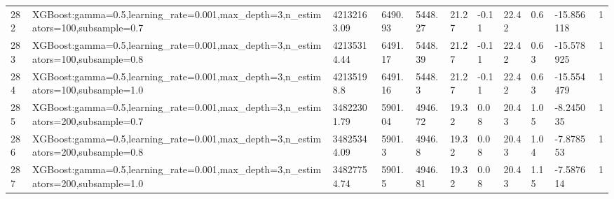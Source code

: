 \begin{longtable}{C{0.8cm} L{2cm} C{1.15cm} C{1.15cm} C{1.15cm} C{1.15cm} C{0.85cm} C{1.25cm} C{1.2cm} C{1.5cm} C{1.0cm}}
282 & XGBoost:\newline gamma=0.5,\newline learning\_rate=0.001,\newline max\_depth=3,\newline n\_estimators=100,\newline subsample=0.7 & 42132163.09 & 6490.93 & 5448.27 & 21.27 & -0.11 & 22.42 & 0.6 & -15.856118 & 1 \\
283 & XGBoost:\newline gamma=0.5,\newline learning\_rate=0.001,\newline max\_depth=3,\newline n\_estimators=100,\newline subsample=0.8 & 42135314.44 & 6491.17 & 5448.39 & 21.27 & -0.11 & 22.42 & 0.63 & -15.578925 & 1 \\
284 & XGBoost:\newline gamma=0.5,\newline learning\_rate=0.001,\newline max\_depth=3,\newline n\_estimators=100,\newline subsample=1.0 & 42135198.8 & 6491.16 & 5448.3 & 21.27 & -0.11 & 22.42 & 0.63 & -15.554479 & 1 \\
285 & XGBoost:\newline gamma=0.5,\newline learning\_rate=0.001,\newline max\_depth=3,\newline n\_estimators=200,\newline subsample=0.7 & 34822301.79 & 5901.04 & 4946.72 & 19.32 & 0.08 & 20.43 & 1.05 & -8.245035 & 1 \\
286 & XGBoost:\newline gamma=0.5,\newline learning\_rate=0.001,\newline max\_depth=3,\newline n\_estimators=200,\newline subsample=0.8 & 34825344.09 & 5901.3 & 4946.8 & 19.32 & 0.08 & 20.43 & 1.04 & -7.878553 & 1 \\
287 & XGBoost:\newline gamma=0.5,\newline learning\_rate=0.001,\newline max\_depth=3,\newline n\_estimators=200,\newline subsample=1.0 & 34827754.74 & 5901.5 & 4946.81 & 19.32 & 0.08 & 20.43 & 1.15 & -7.587614 & 1 \\

\end{longtable}
